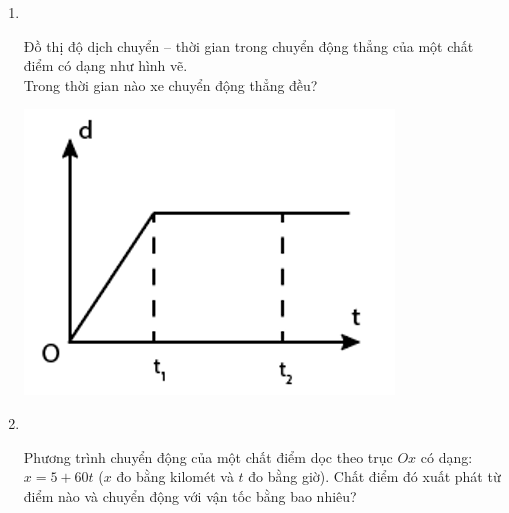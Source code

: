 \begin{enumerate}[label=\bfseries Câu \arabic*:]
\item {}\\
{\begin{minipage}[l]{0.7\textwidth}
		Đồ thị độ dịch chuyển – thời gian trong chuyển động thẳng của một chất điểm có dạng như hình vẽ.\\
		Trong thời gian nào xe chuyển động thẳng đều?
	\end{minipage}
\begin{minipage}{0.3\textwidth}
	\begin{center}
		\includegraphics[width=0.8\linewidth]{../figs/VN10-2023-PH-TP005-P-4}
	\end{center}
\end{minipage}
}

\item {}\\
{Phương trình chuyển động của một chất điểm dọc theo trục $Ox$ có dạng: $x = 5 + 60t$ ($x$ đo bằng kilomét và $t$ đo bằng giờ). Chất điểm đó xuất phát từ điểm nào và chuyển động với vận tốc bằng bao nhiêu?

}
\end{enumerate}
